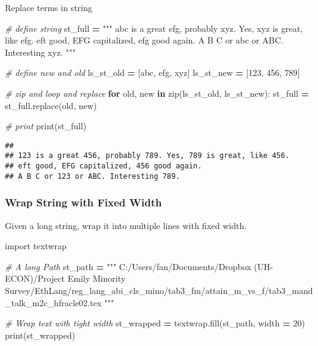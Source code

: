 \documentclass[
]{book}
\newenvironment{Shaded}{\begin{snugshade}}{\end{snugshade}}
\newcommand{\BuiltInTok}[1]{#1}
\newcommand{\CommentTok}[1]{\textcolor[rgb]{0.56,0.35,0.01}{\textit{#1}}}
\newcommand{\ControlFlowTok}[1]{\textcolor[rgb]{0.13,0.29,0.53}{\textbf{#1}}}
\newcommand{\DecValTok}[1]{\textcolor[rgb]{0.00,0.00,0.81}{#1}}
\newcommand{\ImportTok}[1]{#1}
\newcommand{\KeywordTok}[1]{\textcolor[rgb]{0.13,0.29,0.53}{\textbf{#1}}}
\newcommand{\NormalTok}[1]{#1}
\newcommand{\OperatorTok}[1]{\textcolor[rgb]{0.81,0.36,0.00}{\textbf{#1}}}
\newcommand{\StringTok}[1]{\textcolor[rgb]{0.31,0.60,0.02}{#1}}
\begin{document}
Replace terms in string

\begin{Shaded}
\begin{Highlighting}[]
\CommentTok{\# define string}
\NormalTok{st\_full }\OperatorTok{=} \StringTok{"""}
\StringTok{abc is a great efg, probably xyz. Yes, xyz is great, like efg. }
\StringTok{eft good, EFG capitalized, efg good again. }
\StringTok{A B C or abc or ABC. Interesting xyz. }
\StringTok{"""}

\CommentTok{\# define new and old}
\NormalTok{ls\_st\_old }\OperatorTok{=}\NormalTok{ [}\StringTok{\textquotesingle{}abc\textquotesingle{}}\NormalTok{, }\StringTok{\textquotesingle{}efg\textquotesingle{}}\NormalTok{, }\StringTok{\textquotesingle{}xyz\textquotesingle{}}\NormalTok{]}
\NormalTok{ls\_st\_new }\OperatorTok{=}\NormalTok{ [}\StringTok{\textquotesingle{}123\textquotesingle{}}\NormalTok{, }\StringTok{\textquotesingle{}456\textquotesingle{}}\NormalTok{, }\StringTok{\textquotesingle{}789\textquotesingle{}}\NormalTok{]}

\CommentTok{\# zip and loop and replace}
\ControlFlowTok{for}\NormalTok{ old, new }\KeywordTok{in} \BuiltInTok{zip}\NormalTok{(ls\_st\_old, ls\_st\_new):}
\NormalTok{  st\_full }\OperatorTok{=}\NormalTok{ st\_full.replace(old, new)}

\CommentTok{\# print}
\BuiltInTok{print}\NormalTok{(st\_full)}
\end{Highlighting}
\end{Shaded}

\begin{verbatim}
## 
## 123 is a great 456, probably 789. Yes, 789 is great, like 456. 
## eft good, EFG capitalized, 456 good again. 
## A B C or 123 or ABC. Interesting 789.
\end{verbatim}

\hypertarget{wrap-string-with-fixed-width}{%
\subsubsection{Wrap String with Fixed Width}\label{wrap-string-with-fixed-width}}

Given a long string, wrap it into multiple lines with fixed width.

\begin{Shaded}
\begin{Highlighting}[]
\ImportTok{import}\NormalTok{ textwrap}

\CommentTok{\# A long Path}
\NormalTok{st\_path }\OperatorTok{=} \StringTok{"""}
\StringTok{C:/Users/fan/Documents/Dropbox (UH{-}ECON)/Project Emily Minority Survey/EthLang/reg\_lang\_abi\_cls\_mino/tab3\_fm/attain\_m\_vs\_f/tab3\_mand\_talk\_m2c\_hfracle02.tex}
\StringTok{"""}

\CommentTok{\# Wrap text with tight width}
\NormalTok{st\_wrapped }\OperatorTok{=}\NormalTok{ textwrap.fill(st\_path, width }\OperatorTok{=} \DecValTok{20}\NormalTok{)}
\BuiltInTok{print}\NormalTok{(st\_wrapped)}
\end{Highlighting}
\end{Shaded}
\end{document}
